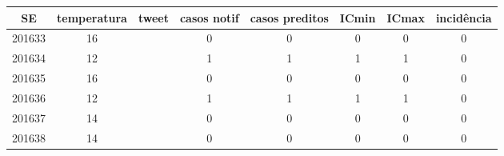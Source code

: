 \begin{tabular}{c|ccccccc}
  \hline
SE & temperatura & tweet & casos notif & casos preditos & ICmin & ICmax & incidência \\ 
  \hline
201633 & 16 &  & 0 & 0 & 0 & 0 & 0 \\ 
  201634 & 12 &  & 1 & 1 & 1 & 1 & 0 \\ 
  201635 & 16 &  & 0 & 0 & 0 & 0 & 0 \\ 
  201636 & 12 &  & 1 & 1 & 1 & 1 & 0 \\ 
  201637 & 14 &  & 0 & 0 & 0 & 0 & 0 \\ 
  201638 & 14 &  & 0 & 0 & 0 & 0 & 0 \\ 
   \hline
\end{tabular}
